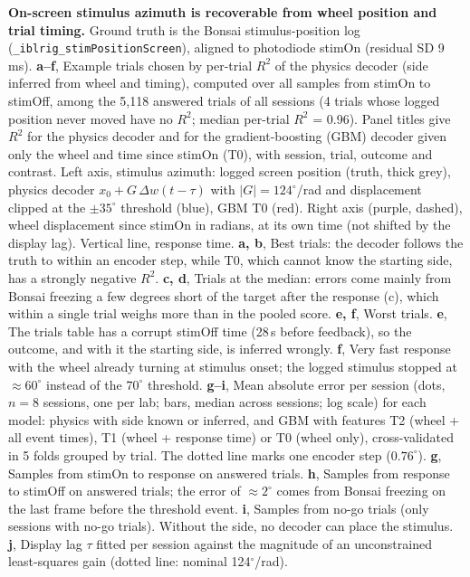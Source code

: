 \caption{\textbf{On-screen stimulus azimuth is recoverable from wheel position and trial timing.} Ground truth is the Bonsai stimulus-position log (\texttt{\_iblrig\_stimPositionScreen}), aligned to photodiode stimOn (residual SD 9 ms). \textbf{a--f}, Example trials chosen by per-trial $R^2$ of the physics decoder (side inferred from wheel and timing), computed over all samples from stimOn to stimOff, among the 5{,}118 answered trials of all sessions (4 trials whose logged position never moved have no $R^2$; median per-trial $R^2$ = 0.96). Panel titles give $R^2$ for the physics decoder and for the gradient-boosting (GBM) decoder given only the wheel and time since stimOn (T0), with session, trial, outcome and contrast. Left axis, stimulus azimuth: logged screen position (truth, thick grey), physics decoder $x_0 + G\,\Delta w(t-\tau)$ with $|G| = 124^\circ$/rad and displacement clipped at the $\pm35^\circ$ threshold (blue), GBM T0 (red). Right axis (purple, dashed), wheel displacement since stimOn in radians, at its own time (not shifted by the display lag). Vertical line, response time. \textbf{a, b}, Best trials: the decoder follows the truth to within an encoder step, while T0, which cannot know the starting side, has a strongly negative $R^2$. \textbf{c, d}, Trials at the median: errors come mainly from Bonsai freezing a few degrees short of the target after the response (c), which within a single trial weighs more than in the pooled score. \textbf{e, f}, Worst trials. \textbf{e}, The trials table has a corrupt stimOff time (28\,s before feedback), so the outcome, and with it the starting side, is inferred wrongly. \textbf{f}, Very fast response with the wheel already turning at stimulus onset; the logged stimulus stopped at $\approx60^\circ$ instead of the $70^\circ$ threshold. \textbf{g--i}, Mean absolute error per session (dots, $n=8$ sessions, one per lab; bars, median across sessions; log scale) for each model: physics with side known or inferred, and GBM with features T2 (wheel + all event times), T1 (wheel + response time) or T0 (wheel only), cross-validated in 5 folds grouped by trial. The dotted line marks one encoder step ($0.76^\circ$). \textbf{g}, Samples from stimOn to response on answered trials. \textbf{h}, Samples from response to stimOff on answered trials; the error of $\approx2^\circ$ comes from Bonsai freezing on the last frame before the threshold event. \textbf{i}, Samples from no-go trials (only sessions with no-go trials). Without the side, no decoder can place the stimulus. \textbf{j}, Display lag $\tau$ fitted per session against the magnitude of an unconstrained least-squares gain (dotted line: nominal 124$^\circ$/rad).}
